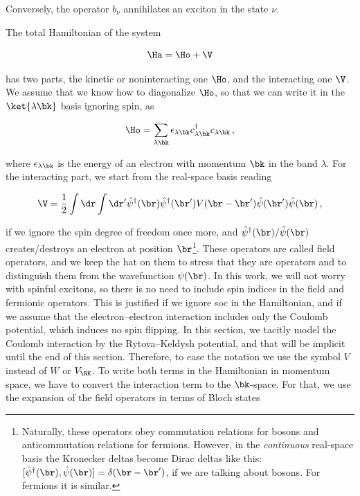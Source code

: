 \noindent Conversely, the operator $b_{\nu}$ annihilates an exciton in the state $\nu$.

The total Hamiltonian of the system

\begin{equation}
    \Ha = \Ho + \V
\end{equation}

\noindent has two parts, the kinetic or noninteracting one $\Ho$, and the interacting one $\V$.
We assume that we know how to diagonalize $\Ho$, so that we can write it in the $\ket{\lambda \bk}$ basis ignoring spin, as

\begin{equation}
    \Ho = \sum_{\lambda \bk} \epsilon_{\lambda \bk} c^{\dagger}_{\lambda \bk} c_{\lambda \bk}\,,
\end{equation}

\noindent where $\epsilon_{\lambda \bk}$ is the energy of an electron with momentum $\bk$ in the band $\lambda$.
For the interacting part, we start from the real-space basis reading

\begin{equation}
    \label{eq:interaction_hamiltonian_field_operators}
    \V = \frac{1}{2} \int \dr \int \dr '\hat{\psi}^{\dagger}(\br)\hat{\psi}^{\dagger}(\br') V(\br - \br') \hat{\psi}(\br')\hat{\psi}(\br) \,,
\end{equation}

\noindent if we ignore the spin degree of freedom once more, and $\hat{\psi}^{\dagger}(\br)/\hat{\psi}(\br)$ creates/destroys an electron at position $\br$\footnote{Naturally, these operators obey commutation relations for bosons and anticommutation relations for fermions. However, in the \textit{continuous} real-space basis the Kronecker deltas become Dirac deltas like this: $[\hat{\psi}^{\dagger}(\br),\hat{\psi}(\br)] = \delta(\br - \br')$, if we are talking about bosons. For fermions it is similar.}.
These operators are called field operators, and we keep the hat on them to stress that they are operators and to distinguish them from the wavefunction $\psi(\br)$.
In this work, we will not worry with spinful excitons, so there is no need to include spin indices in the field and fermionic operators.
This is justified if we ignore \gls{soc} in the Hamiltonian, and if we assume that the electron--electron interaction includes only the Coulomb potential, which induces no spin flipping.
In this section, we tacitly model the Coulomb interaction by the Rytova--Keldysh potential, and that will be implicit until the end of this section.
Therefore, to ease the notation we use the symbol $V$ instead of $W$ or $V_{\RK}$.
To write both terms in the Hamiltonian in momentum space, we have to convert the interaction term to the $\bk$-space.
For that, we use the expansion of the field operators in terms of Bloch states

